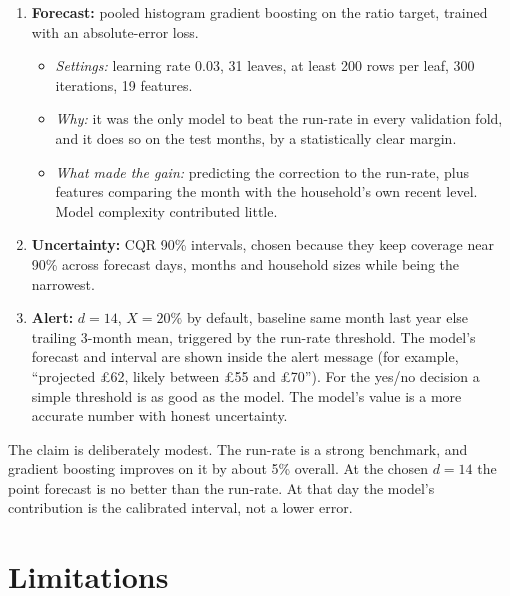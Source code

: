 \documentclass[11pt,letterpaper]{article}
\begin{document}
\begin{enumerate}
  \item \textbf{Forecast:} pooled histogram gradient boosting on the ratio target, trained with an absolute-error
  loss.
  \begin{itemize}
    \item \emph{Settings:} learning rate 0.03, 31 leaves, at least 200 rows per leaf, 300 iterations, 19 features.
    \item \emph{Why:} it was the only model to beat the run-rate in every validation fold, and it does so on the
    test months, by a statistically clear margin.
    \item \emph{What made the gain:} predicting the correction to the run-rate, plus features comparing the month
    with the household's own recent level. Model complexity contributed little.
  \end{itemize}
  \item \textbf{Uncertainty:} CQR 90\% intervals, chosen because they keep coverage near 90\% across forecast days,
  months and household sizes while being the narrowest.
  \item \textbf{Alert:} $d = 14$, $X = 20\%$ by default, baseline same month last year else trailing 3-month mean,
  triggered by the run-rate threshold. The model's forecast and interval are shown inside the alert message (for
  example, ``projected \pounds 62, likely between \pounds 55 and \pounds 70''). For the yes/no decision a simple
  threshold is as good as the model. The model's value is a more accurate number with honest uncertainty.
\end{enumerate}

The claim is deliberately modest. The run-rate is a strong benchmark, and gradient boosting improves on it by
about 5\% overall. At the chosen $d = 14$ the point forecast is no better than the run-rate. At that day the
model's contribution is the calibrated interval, not a lower error.

\section{Limitations}
\label{sec:limits}
\end{document}
